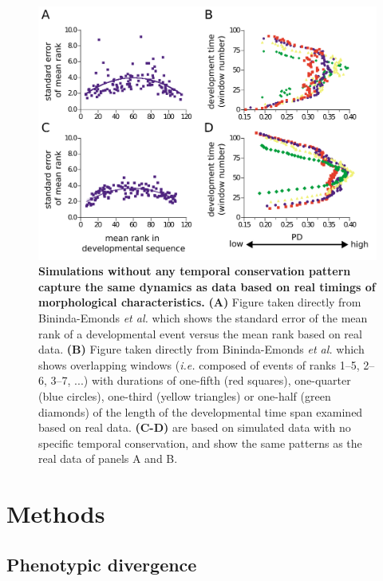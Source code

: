 \begin{figure} [H]
    \includegraphics[width=\linewidth]{ch.inverthourglass/imgs/inverting.png}
    \caption{\textbf{Simulations without any temporal conservation pattern capture the same dynamics as data based on real timings of morphological characteristics.} \textbf{(A)} Figure taken directly from Bininda-Emonds \textit{et al.}\cite{OlafRP2003} which shows the standard error of the mean rank of a developmental event versus the mean rank based on real data. \textbf{(B)} Figure taken directly from Bininda-Emonds \textit{et al.}\cite{OlafRP2003} which shows overlapping windows (\textit{i.e.} composed of events of ranks 1–5, 2–6, 3–7, ...) with durations of one-fifth (red squares), one-quarter (blue circles), one-third (yellow triangles) or one-half (green diamonds) of the length of the developmental time span examined based on real data. \textbf{(C-D)} are based on simulated data with no specific temporal conservation, and show the same patterns as the real data of panels A and B. }
    \label{fig:inverting_inversehourglass}
\end{figure}

\newpage

\section{Methods}

\subsection{Phenotypic divergence}

